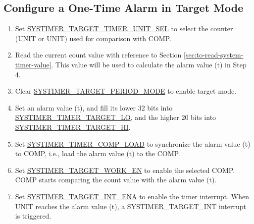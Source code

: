 \documentclass[main\_\_EN.tex]{subfiles}
\begin{document}
\subsection{Configure a One-Time Alarm in Target Mode}
\begin{enumerate}
    \item Set \hyperref[fielddesc:SYSTIMERTARGET0TIMERUNITSEL]{SYSTIMER\_TARGET\_TIMER\_UNIT\_SEL} to select the counter (UNIT or UNIT) used for comparison with COMP.
    \item Read the current count value with reference to Section \ref{sec:to-read-system-timer-value}. This value will be used to calculate the alarm value (t) in Step 4.
    \item Clear \hyperref[fielddesc:SYSTIMERTARGET0PERIODMODE]{SYSTIMER\_TARGET\_PERIOD\_MODE} to enable target mode.
    \item Set an alarm value (t), and fill its lower 32 bits into \hyperref[fielddesc:SYSTIMERTIMERTARGET0LO]{SYSTIMER\_TIMER\_TARGET\_LO}, and the higher 20 bits into \hyperref[fielddesc:SYSTIMERTIMERTARGET0HI]{SYSTIMER\_TIMER\_TARGET\_HI}.
    \item Set \hyperref[fielddesc:SYSTIMERTIMERCOMP0LOAD]{SYSTIMER\_TIMER\_COMP\_LOAD} to synchronize the alarm value (t) to COMP, i.e., load the alarm value (t) to the COMP.
    \item Set \hyperref[fielddesc:SYSTIMERTARGET0WORKEN]{SYSTIMER\_TARGET\_WORK\_EN} to enable the selected COMP. COMP starts comparing the count value with the alarm value (t).
    \item Set \hyperref[fielddesc:SYSTIMERTARGET0INTENA]{SYSTIMER\_TARGET\_INT\_ENA} to enable the timer interrupt. When UNIT reaches the alarm value (t), a SYSTIMER\_TARGET\_INT interrupt is triggered.
\end{enumerate}
\end{document}
